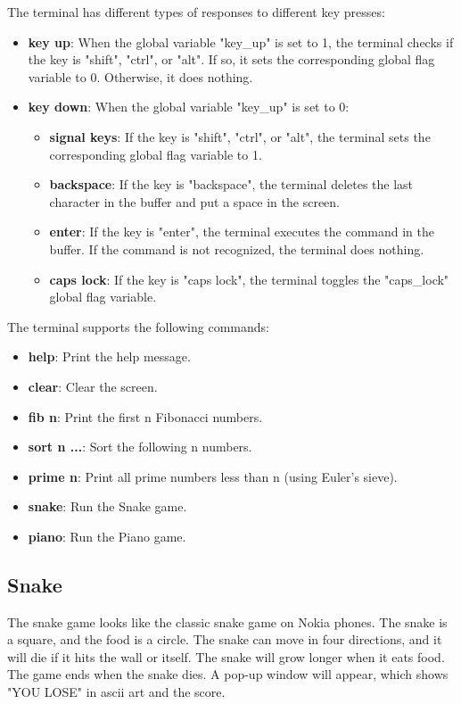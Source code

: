\documentclass[
	a4paper, %
	11pt, %
]{CSUniSchoolLabReport}
\begin{document}
The terminal has different types of responses to different key presses:
\begin{itemize}
    \item \textbf{key up}: When the global variable "key\_up" is set to 1, the terminal checks if the key is "shift", "ctrl", or "alt". If so, it sets the corresponding global flag variable to 0. Otherwise, it does nothing.
    \item \textbf{key down}: When the global variable "key\_up" is set to 0:
          \begin{itemize}
              \item \textbf{signal keys}: If the key is "shift", "ctrl", or "alt", the terminal sets the corresponding global flag variable to 1.
              \item \textbf{backspace}: If the key is "backspace", the terminal deletes the last character in the buffer and put a space in the screen.
              \item \textbf{enter}: If the key is "enter", the terminal executes the command in the buffer. If the command is not recognized, the terminal does nothing.
              \item \textbf{caps lock}: If the key is "caps lock", the terminal toggles the "caps\_lock" global flag variable.
          \end{itemize}
\end{itemize}
The terminal supports the following commands:
\begin{itemize}
    \item \textbf{help}: Print the help message.
    \item \textbf{clear}: Clear the screen.
    \item \textbf{fib n}: Print the first n Fibonacci numbers.
    \item \textbf{sort n ...}: Sort the following n numbers.
    \item \textbf{prime n}: Print all prime numbers less than n (using Euler's sieve).
    \item \textbf{snake}: Run the Snake game.
    \item \textbf{piano}: Run the Piano game.
\end{itemize}
\subsection{Snake}
The snake game looks like the classic snake game on Nokia phones. The snake is a square, and the food is a circle. The snake can move in four directions, and it will die if it hits the wall or itself. The snake will grow longer when it eats food. The game ends when the snake dies. A pop-up window will appear, which shows "YOU LOSE" in ascii art and the score.
\end{document}
